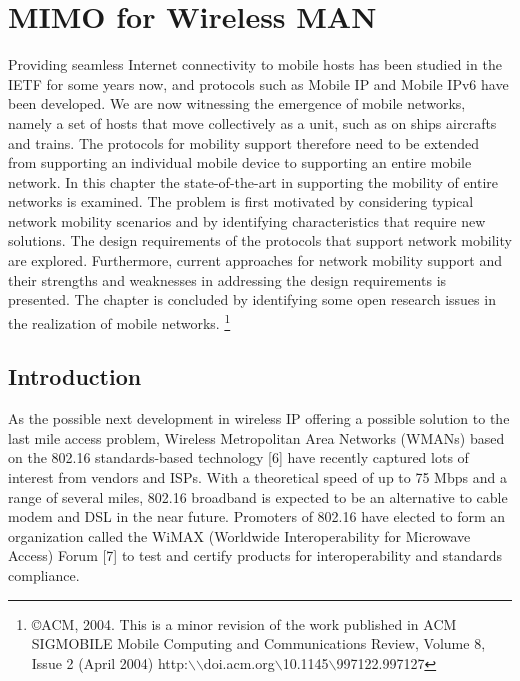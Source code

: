 \chapter{MIMO for Wireless MAN}
\author{Xiaopeng Fan, Steven Y. Lai, Yuan Zheng, Jiannong Cao\\
Hong Kong Polytechnic University}

Providing seamless Internet connectivity to mobile hosts has been studied in
the IETF for some years now, and protocols such as Mobile IP and Mobile IPv6
have been developed. We are now witnessing the emergence of mobile networks,
namely a set of hosts that move collectively as a unit, such as on ships
aircrafts and trains. The protocols for mobility support therefore need to be
extended from supporting an individual mobile device to supporting an entire
mobile network. In this chapter the state-of-the-art in supporting the
mobility of entire networks is examined. The problem is first motivated by
considering typical network mobility scenarios and by identifying
characteristics that require new solutions. The design requirements of the
protocols that support network mobility are explored. Furthermore, current
approaches for network mobility support and their strengths and weaknesses in
addressing the design requirements is presented. The chapter is concluded by
identifying some open research issues in the realization of mobile networks.
\footnote{\copyright ACM, 2004. This is a minor revision of the work published in ACM
SIGMOBILE Mobile Computing and Communications Review, Volume 8, Issue 2 (April 2004) http:$\backslash$$\backslash$doi.acm.org$\backslash$10.1145$\backslash$997122.997127}

\section{Introduction}
As the possible next development in wireless IP offering a possible
solution to the last mile access problem, Wireless Metropolitan Area
Networks (WMANs) based on the 802.16 standards-based technology [6]
have recently captured lots of interest from vendors and ISPs. With
a theoretical speed of up to 75 Mbps and a range of several miles,
802.16 broadband is expected to be an alternative to cable modem and
DSL in the near future. Promoters of 802.16 have elected to form an
organization called the WiMAX (Worldwide Interoperability for
Microwave Access) Forum [7] to test and certify products for
interoperability and standards compliance.

